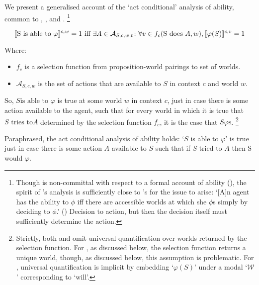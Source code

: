 \begin{note}[ACA]
  We present a generalised account of the `act conditional' analysis of ability, common to \textcite{Boylan:2020aa}, \textcite{Mandelkern:2017aa}, and \textcite{Schwarz:2020aa}.%
  \footnote{
    Though \citeauthor{Schwarz:2020aa} is non-committal with respect to a formal account of ability (\citeyear[cf.][13]{Schwarz:2020aa}), the spirit of \citeauthor{Schwarz:2020aa}'s analysis is sufficiently close to \citeauthor{Boylan:2020aa}'s for the issue to arise:
    `[A]n agent has the ability to \(\phi\) iff there are accessible worlds at which she \(\phi\)s simply by deciding to \(\phi\).' (\citeyear[19]{Schwarz:2020aa})
    Decision to action, but then the decision itself must sufficiently determine the action.
  }

  \[%
    \sem[c,w]{\text{S is able to }\varphi} = 1\text{ iff }\exists A \in \mathcal{A}_{S,c,w,t}\colon \forall v \in f_{c}(\text{S does }A,w),  \sem[c,v]{\varphi(S)} = 1%
  \]

  Where:
  \begin{itemize}
  \item
    \(f_{c}\) is a selection function from proposition-world pairings to set of worlds.
  \item
    \(\mathcal{A}_{S,c,w}\) is the set of actions that are available to \(S\) in context \(c\) and world \(w\).
  \end{itemize}

  So, \(S\text{is able to }\varphi\) is true at some world \(w\) in context \(c\), just in case there is some action available to the agent, such that for every world in which it is true that \(S\text{ tries to}A\) determined by the selection function \(f_{c}\), it is the case that \(S \varphi\text{s}\).%
  \footnote{
    Strictly, both \citeauthor{Mandelkern:2017aa} and \citeauthor{Boylan:2020aa} omit universal quantification over worlds returned by the selection function.
    For \citeauthor{Mandelkern:2017aa}, as discussed below, the selection function returns a unique world, though, as discussed below, this assumption is problematic.
    For \citeauthor{Boylan:2020aa}, universal quantification is implicit by embedding `\(\varphi(S)\)' under a modal `\(\mathcal{W}\)' corresponding to `will'.
  }

  Paraphrased, the act conditional analysis of ability holds:
  `\(S\) is able to \(\varphi\)' is true just in case there is some action \(A\) available to \(S\) such that if \(S\) tried to \(A\) then S would \(\varphi\).
\end{note}

